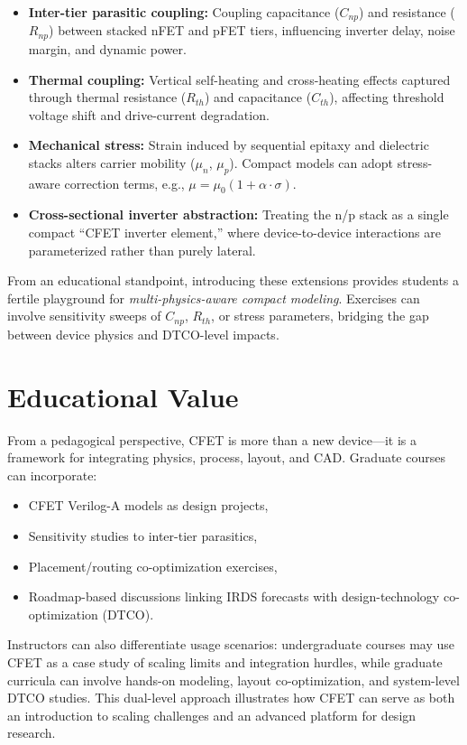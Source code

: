 \documentclass[conference]{IEEEtran}
\begin{document}
\begin{itemize}
  \item \textbf{Inter-tier parasitic coupling:} Coupling capacitance ($C_{np}$) and resistance ($R_{np}$) between stacked nFET and pFET tiers,
  influencing inverter delay, noise margin, and dynamic power.
  \item \textbf{Thermal coupling:} Vertical self-heating and cross-heating effects captured through thermal resistance ($R_{th}$) and capacitance ($C_{th}$),
  affecting threshold voltage shift and drive-current degradation.
  \item \textbf{Mechanical stress:} Strain induced by sequential epitaxy and dielectric stacks alters carrier mobility ($\mu_n$, $\mu_p$).
  Compact models can adopt stress-aware correction terms, e.g., $\mu = \mu_0 (1 + \alpha \cdot \sigma)$.
  \item \textbf{Cross-sectional inverter abstraction:} Treating the n/p stack as a single compact ``CFET inverter element,'' where
  device-to-device interactions are parameterized rather than purely lateral.
\end{itemize}

From an educational standpoint, introducing these extensions provides students
a fertile playground for \emph{multi-physics-aware compact modeling}.
Exercises can involve sensitivity sweeps of $C_{np}$, $R_{th}$, or stress parameters,
bridging the gap between device physics and DTCO-level impacts.

\section{Educational Value}
From a pedagogical perspective, CFET is more than a new device—it is a framework for integrating physics, process, layout, and CAD.
Graduate courses can incorporate:
\begin{itemize}
  \item CFET Verilog-A models as design projects,
  \item Sensitivity studies to inter-tier parasitics,
  \item Placement/routing co-optimization exercises,
  \item Roadmap-based discussions linking IRDS forecasts with design-technology co-optimization (DTCO).
\end{itemize}
Instructors can also differentiate usage scenarios:
undergraduate courses may use CFET as a case study of scaling limits and integration hurdles,
while graduate curricula can involve hands-on modeling, layout co-optimization, and system-level DTCO studies.
This dual-level approach illustrates how CFET can serve as both an introduction to scaling challenges and an advanced platform for design research.
\end{document}
